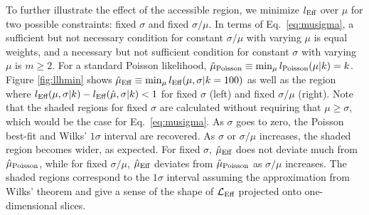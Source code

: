 To further illustrate the effect of the accessible region, we minimize $l_\textmd{Eff}$ over $\mu$ for two possible constraints: fixed $\sigma$ and fixed $\sigma/\mu$. In terms of Eq.~\eqref{eq:musigma}, a sufficient but not necessary condition for constant $\sigma/\mu$ with varying $\mu$ is equal weights, and a necessary but not sufficient condition for constant $\sigma$ with varying $\mu$ is $m \geq 2$. For a standard Poisson likelihood, $\hat{\mu}_\textmd{Poisson}\equiv \min_\mu l_{\textmd{Poisson}}(\mu|k) = k$. Figure \ref{fig:llhmin} shows $\hat{\mu}_\textmd{Eff} \equiv \min_\mu l_\textmd{Eff}(\mu,\sigma|k=100)$ as well as the region where $l_\textmd{Eff}(\mu, \sigma|k) - l_\textmd{Eff}(\hat{\mu}, \sigma|k) < 1$ for fixed $\sigma$ (left) and fixed $\sigma/\mu$ (right). Note that the shaded regions for fixed $\sigma$ are calculated without requiring that $\mu \geq \sigma$, which would be the case for Eq.~\eqref{eq:musigma}. As $\sigma$ goes to zero, the Poisson best-fit and Wilks' $1\sigma$ interval are recovered. As $\sigma$ or $\sigma/\mu$ increases, the shaded region becomes wider, as expected. For fixed $\sigma$, $\hat{\mu}_\textmd{Eff}$ does not deviate much from $\hat{\mu}_\textmd{Poisson}$, while for fixed $\sigma/\mu$, $\hat{\mu}_\textmd{Eff}$ deviates from $\hat{\mu}_\textmd{Poisson}$ as $\sigma/\mu$ increases. The shaded regions correspond to the $1\sigma$ interval assuming the approximation from Wilks' theorem and give a sense of the shape of $\mathcal{L}_\textmd{Eff}$ projected onto one-dimensional slices.
